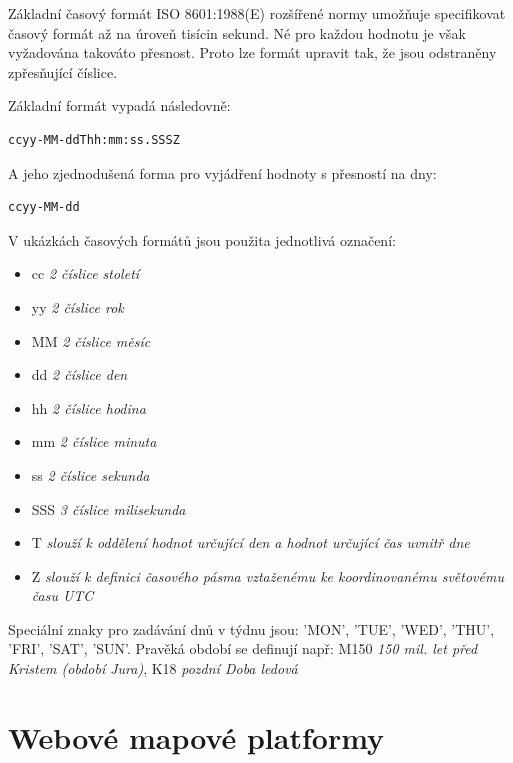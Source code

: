 Základní časový formát ISO 8601:1988(E) rozšířené normy umožňuje specifikovat časový formát až na úroveň tisícin sekund. Né pro každou hodnotu je však vyžadována takováto přesnost. Proto lze formát upravit tak, že jsou odstraněny zpřesňující číslice. 

\noindent
Základní formát vypadá následovně:

\begin{verbatim}
ccyy-MM-ddThh:mm:ss.SSSZ
\end{verbatim}

\noindent
A jeho zjednodušená forma pro vyjádření hodnoty s přesností na dny:

\begin{verbatim}
ccyy-MM-dd
\end{verbatim}

\newpage
\noindent
V ukázkách časových formátů jsou použita jednotlivá označení:

\begin{itemize}
	\item cc \textit{2 číslice století}
	\item yy \textit{2 číslice rok}
	\item MM \textit{2 číslice měsíc}
	\item dd \textit{2 číslice den}
	\item hh \textit{2 číslice hodina}
	\item mm \textit{2 číslice minuta}
	\item ss \textit{2 číslice sekunda}
	\item SSS \textit{3 číslice milisekunda}
\end{itemize}

\begin{itemize}
	\item T \textit{slouží k oddělení hodnot určující den a hodnot určující čas uvnitř dne}
	\item Z \textit{slouží k definici časového pásma vztaženému ke koordinovanému světovému času UTC}
\end{itemize}

Speciální znaky pro zadávání dnů v týdnu jsou: 'MON', 'TUE', 'WED', 'THU', 'FRI', 'SAT', 'SUN'. Pravěká období se definují např: M150 \textit{150 mil. let před Kristem (období Jura)}, K18 \textit{pozdní Doba ledová}

\newpage
\section{Webové mapové platformy}

